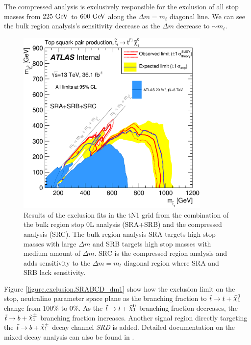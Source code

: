 \indent The compressed analysis is exclusively responsible for the exclusion of all stop masses from $225 \gev$ to $600 \gev$ along the $\Delta m = m_{t}$ diagonal line.  We can see the bulk region analysis's sensitivity decrease as the  $\Delta m$ decrease to $\sim m_{t}$.  \\

\begin{figure}[htbp]
	\begin{center}
		\includegraphics[width=0.85\textwidth]{figures/fit/atlascls_m0m12_wband1_showcms0_StopZL2016_SRABC_Tt_directTTplusbWN_all_Output_fixSigXSecNominal_hypotest__1_harvest_list.eps}
		\caption{Results of the exclusion fits in the tN1 grid from the combination of the bulk region stop 0L analysis (SRA+SRB) and the compressed analysis (SRC). The bulk region analysis SRA targets high stop masses with large $\Delta m$ and SRB targets high stop masses with medium amount of $\Delta m$.  SRC is the compressed region analysis and adds sensitivity to the $\Delta m = m_{t}$ diagonal region where SRA and SRB lack sensitivity. }
		\label{figure.exclusion.SRABC}
	\end{center}
\end{figure}

\indent Figure \ref{figure.exclusion.SRABCD_dm1} show how the exclusion limit on the stop, neutralino parameter space plane as the branching fraction to $\stop \rightarrow t+\ninoone$ change from 100\% to 0\%.  As the $\stop \rightarrow t+\ninoone$ branching fraction decreases, the $\stop \rightarrow b+\chinoonepm$ branching fraction increases.  Another signal region directly targeting the $\stop \rightarrow b+\chinoonepm$ decay channel {\it SRD} is added.  Detailed documentation on the mixed decay analysis can also be found in \cite{stop0Lmoriond}. \\

